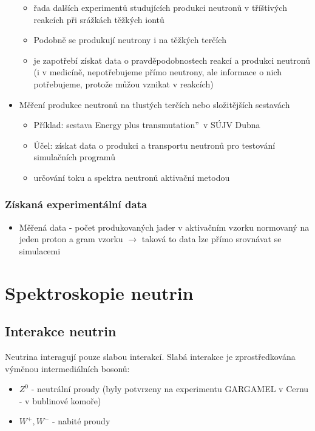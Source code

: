 \documentclass[../../main.tex]{subfiles}
\begin{document}
\begin{itemize}
\begin{itemize}
   \item řada dalších experimentů studujících produkci neutronů v tříštivých reakcích při srážkách těžkých iontů
   \item Podobně se produkují neutrony i na těžkých terčích
   \item je zapotřebí získat data o pravděpodobnostech reakcí a produkci neutronů (i v medicíně, nepotřebujeme přímo neutrony, ale informace o nich potřebujeme, protože můžou vznikat v reakcích)
   \end{itemize}
   \item Měření produkce neutronů na tlustých terčích nebo složitějších sestavách
   \begin{itemize}
   	\item Příklad: sestava \quotedblbase Energy plus transmutation\textquotedblright ~v SÚJV Dubna
   	\item Účel: získat data o produkci a transportu neutronů pro testování simulačních programů
   	\item určování toku a spektra neutronů aktivační metodou
   	\end{itemize}
\end{itemize}

\subsection{Získaná experimentální data}

\begin{itemize}
	\item Měřená data - počet produkovaných jader v aktivačním vzorku normovaný na jeden proton a gram vzorku $\rightarrow$ taková to data lze přímo srovnávat se simulacemi
\end{itemize}

\chapter{Spektroskopie neutrin}

\section{Interakce neutrin}

Neutrina interagují pouze slabou interakcí. Slabá interakce je zprostředkována výměnou intermediálních bosonů:
\begin{itemize}
	\item $Z^0$ - neutrální proudy (byly potvrzeny na experimentu GARGAMEL v Cernu - v bublinové komoře)
	\item $W^+, W^-$ - nabité proudy
\end{itemize}
\end{document}
